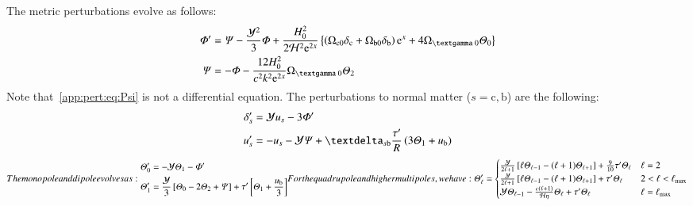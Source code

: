 The metric perturbations evolve as follows:
\begin{subequations}\label{app:pert:eq:metric_perturbations}
\begin{align} 
    \Phi' &= \Psi - \frac{\ckH^2}{3} \Phi + \frac{H_0^2}{2\Hp^2\eu[2x]}\left\{ \left(\Omega\ped{c 0}\delta\ped{c} + \Omega\ped{b 0}\delta\ped{b} \right)\eu[x]+4\Omega\gped{\textgamma 0}\Theta_0\right\} \label{app:pert:eq:dPhidx}\\
    \Psi &= - \Phi - \frac{12H_0^2}{c^2k^2\eu^{2x}} \Omega\gped{\textgamma 0}\Theta_2 \label{app:pert:eq:Psi}
\end{align}
\end{subequations}
Note that~\cref{app:pert:eq:Psi} is not a differential equation. The perturbations to normal matter ($s=\mathrm{c,b}$) are the following:
\begin{subequations}\label{app:pert:eq:matter_perturbations}
\begin{align}
    \delta_s'&=  \ckH u_s - 3\Phi'\label{app:pert:eq:ddelta_sdx}  \\
    u_s' &= - u_s - \ckH\Psi + \deltasym{s\mathrm{b}}  \frac{\tau'}{R} \left(3\Theta_1 +u\ped{b}\right)\label{app:pert:eq:du_sdx} 
\end{align}
\end{subequations}
\begin{subequations}\label{app:pert:eq:photon_multipoles}
The monopole and dipole evolves as:
\begin{align}
    \Theta_0' &= -\ckH \Theta_1 - \Phi ' \label{app:pert:eq:dTheta0dx}\\
    \Theta_1' &= \frac{\ckH}{3} \left[ \Theta_0 - 2\Theta_2 + \Psi \right] + \tau'\left[\Theta_1 + \frac{u\ped{b}}{3} \right] \label{app:pert:eq:dTheta1dx}
\end{align}
For the quadrupole and higher multipoles, we have:
\begin{align}
\Theta_\ell' = \begin{cases}
    \frac{\ckH}{2\ell + 1} \left[ \ell \Theta_{\ell-1}-  (\ell+1) \Theta_{\ell+1} \right] + \frac{9}{10}\tau ' \Theta_\ell & \ell = 2 \\ 
    \frac{\ckH}{2\ell + 1} \left[ \ell \Theta_{\ell-1}-  (\ell+1) \Theta_{\ell+1} \right] + \tau ' \Theta_\ell  & 2< \ell < \ell\ped{max} \\
    \ckH \Theta_{\ell-1} - \frac{c(\ell+1)}{\Hp \eta}\Theta_{\ell} + \tau' \Theta_{\ell}& \ell=\ell\ped{max}
\end{cases} \label{app:pert:eq:dThetaelldx}
\end{align}
\end{subequations}




